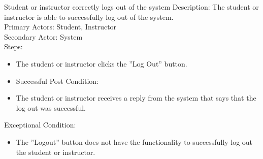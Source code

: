     \begin{section}{Student or instructor correctly logs out of the system}
        Description: The student or instructor is able to successfully log out of the system.\\
        Primary Actors: Student, Instructor\\
        Secondary Actor: System\\
        Steps:
        \begin{itemize}
            \item The student or instructor clicks the ''Log Out'' button.
            \item Successful Post Condition:
            \item The student or instructor receives a reply from the system that says that the log out was successful.
        \end{itemize}
        Exceptional Condition:
        \begin{itemize}
            \item The ''Logout'' button does not have the functionality to successfully log out the student or instructor.
        \end{itemize}


    \end{section}






